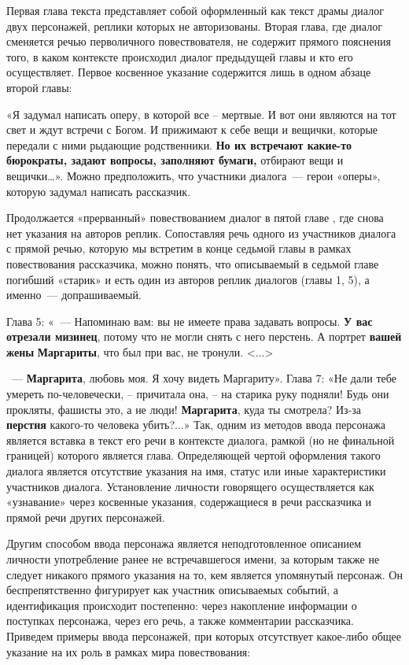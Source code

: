 \documentclass{kursa4}
\begin{document}
        Первая глава текста    представляет собой    оформленный как текст драмы  диалог двух персонажей, реплики которых не авторизованы.   Вторая глава,   где диалог сменяется речью перволичного повествователя, не содержит прямого пояснения того, в каком контексте происходил диалог предыдущей главы и кто его осуществляет.    Первое  косвенное  указание содержится   лишь  в одном абзаце второй главы:  

        «Я задумал написать оперу, в которой все – мертвые. И вот они являются на тот свет и ждут встречи с Богом. И прижимают к себе вещи и вещички, которые передали с ними рыдающие родственники. \textbf{Но их встречают какие-то бюрократы, задают вопросы, заполняют бумаги,}
        отбирают вещи и вещички…». Можно предположить, что участники диалога~--- герои «оперы», которую задумал написать рассказчик. 

        Продолжается «прерванный» повествованием диалог в пятой главе , где снова нет указания на авторов реплик. Сопоставляя речь одного из участников диалога с прямой речью, которую мы встретим в конце седьмой главы в рамках повествования рассказчика, можно понять, что описываемый в седьмой главе погибший «старик» и есть один из авторов реплик диалогов (главы 1, 5), а именно~--- допрашиваемый. 

        Глава 5: «~--- Напоминаю вам: вы не имеете права задавать вопросы. \textbf{У вас отрезали мизинец}, потому что не могли снять с него перстень. А портрет \textbf{вашей жены }\textbf{Маргариты}, что был при вас, не тронули. \textless{}...\textgreater{}

        ~--- \textbf{Маргарита}, любовь моя. Я хочу видеть Маргариту». Глава 7: «Не дали тебе умереть по-человечески, – причитала она, – на старика руку подняли! Будь они прокляты, фашисты это, а не люди! \textbf{Маргарита}, куда ты смотрела? Из-за \textbf{перстня} какого-то человека убить?...» Так, одним из методов ввода персонажа является вставка в текст его речи в контексте диалога, рамкой (но не финальной границей) которого является глава. Определяющей чертой оформления такого диалога является отсутствие указания на имя, статус или иные характеристики участников диалога. Установление личности говорящего осуществляется как «узнавание» через косвенные указания, содержащиеся в речи рассказчика и прямой речи других персонажей. 

        Другим способом ввода персонажа является неподготовленное описанием личности употребление ранее не встречавшегося имени, за которым также не следует никакого прямого указания на то, кем является упомянутый персонаж. Он беспрепятственно фигурирует как участник описываемых событий, а идентификация происходит постепенно: через накопление информации о поступках персонажа, через его речь, а также комментарии рассказчика. Приведем примеры ввода персонажей, при которых отсутствует какое-либо общее указание на их роль в рамках мира повествования: 
\end{document}
